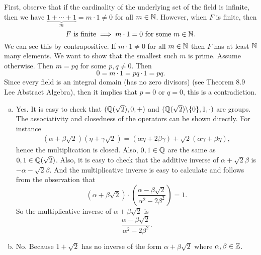 \begin{problem}
	\begin{solution}
		First, observe that if the cardinality of the underlying set of the field is infinite, then we have $ \underbrace{1+\cdots + 1}_m = m\cdot 1 \neq 0 $ for all $ m\in \mathbb{N} $.
		However, when $ F $ is finite, then 
		\[ F\text{ is finite} \implies m\cdot 1 =0 \text{ for some } m\in\mathbb{N}. \]
		We can see this by contrapositive. If $ m\cdot 1 \neq 0 $ for all $ m\in \mathbb{N} $ then $ F $ has at least $ \mathbb{N} $ many elements. We want to show that the smallest such $ m $ is prime. Assume otherwise. Then $ m=pq $ for some $ p,q\neq 0 $. Then 
		\[ 0 = m\cdot 1 = pq\cdot 1 = pq. \]
		Since every field is an integral domain (has no zero divisors) (see Theorem 8.9 Lee Abstract Algebra), then it implies that $ p=0 $  or $ q=0 $, this is a contradiction.
	\end{solution}
\end{problem}

\begin{problem}
	\begin{solution}
		\begin{enumerate}[(a)]
			\item Yes. It is easy to check that $ (\mathbb{Q}(\sqrt{2}),0,+) $ and $ (\mathbb{Q}(\sqrt{2})\backslash\{0\},1,\cdot) $ are groups. The associativity and closedness of the operators can be shown directly. For instance
			\begin{align*}
				(\alpha + \beta\sqrt{2})(\eta + \gamma\sqrt{2}) = (\alpha\eta  + 2\beta\gamma )+ \sqrt{2}(\alpha\gamma + \beta\eta),
			\end{align*}
			hence the multiplication is closed. Also, $ 0,1 \in \mathbb{Q} $ are the same as $ 0,1\in \mathbb{Q}(\sqrt{2}) $. Also, it is easy to check that the additive inverse of $ \alpha + \sqrt{2}\beta $ is $ -\alpha - \sqrt{2}\beta $. And the multiplicative inverse is easy to calculate and follows from the observation that
			\[ (\alpha + \beta\sqrt{2}) \cdot (\frac{\alpha - \beta\sqrt{2}}{\alpha^2 - 2\beta^2}) =1. \]
			So the multiplicative inverse of $ \alpha + \beta\sqrt{2} $ is 
			\[ \frac{\alpha - \beta\sqrt{2}}{\alpha^2 - 2\beta^2}. \]
			\item No. Because $ 1+\sqrt{2} $ has no inverse of the form $ \alpha + \beta\sqrt{2} $ where $ \alpha,\beta \in \mathbb{Z} $. 
		\end{enumerate}
	\end{solution}
\end{problem}

